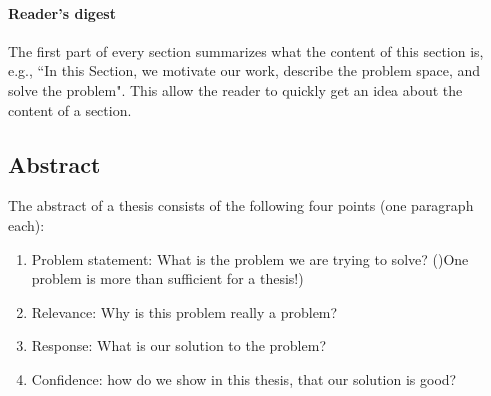 \documentclass{article}
\begin{document}
\paragraph{Reader's digest}
The first part of every section summarizes what the content of this section is, e.g., ``In this Section, we motivate our work, describe the problem space, and solve the problem".
This allow the reader to quickly get an idea about the content of a section.





\subsection{Abstract}

The abstract of a thesis consists of the following four points (one paragraph each):

\begin{enumerate}
	\item Problem statement: What is the problem we are trying to solve? ()One problem is more than sufficient for a thesis!)
	\item Relevance: Why is this problem really a problem?
	\item Response: What is our solution to the problem?
	\item Confidence: how do we show in this thesis, that our solution is good?
\end{enumerate}
\end{document}
